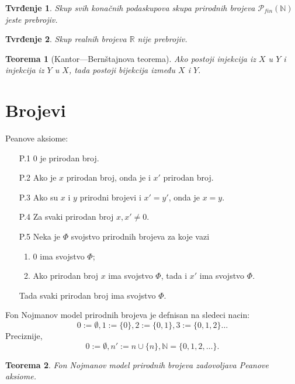 \documentclass[12p,14paper]{article}
\newtheorem*{theorem}{Teorema}
\newtheorem*{prop}{Tvrđenje}
\begin{document}
\begin{multicols}{2}
    \begin{prop}
        Skup svih konačnih podaskupova skupa prirodnih brojeva 
        $\mathcal{P}_{fin} (\mathbb{N})$ jeste prebrojiv.
    \end{prop}

    \begin{prop}
        Skup realnih brojeva $\mathbb{R}$ nije prebrojiv.
    \end{prop}

    \begin{theorem}[Kantor---Bernštajnova teorema]
        Ako postoji injekcija iz $X$ u $Y$ i injekcija iz $Y$ u $X$, 
        tada postoji bijekcija između $X$ i $Y$.
    \end{theorem}

\section{Brojevi}

    Peanove aksiome:
    \begin{enumerate}
        \itemsep0em
        \item [P.1] 0 je prirodan broj.
        \item [P.2] Ako je $x$ prirodan broj, onda je i $x'$ prirodan broj.
        \item [P.3] Ako su $x$ i $y$ prirodni brojevi i $x' = y'$, 
            onda je $x = y$.
        \item [P.4] Za svaki prirodan broj $x, x' \neq 0$.
        \item [P.5] Neka je $\Phi$ svojstvo prirodnih brojeva za koje vazi
            \begin{enumerate}
                \itemsep0em
                \item 0 ima svojstvo $\Phi$;
                \item Ako prirodan broj $x$ ima svojstvo $\Phi$, tada i $x'$ 
                    ima svojstvo $\Phi$.
            \end{enumerate}
            Tada svaki prirodan broj ima svojstvo $\Phi$.
    \end{enumerate}

    Fon Nojmanov model prirodnih brojeva je defnisan na sledeci nacin:
    \[
        0 := \emptyset, 1 := \{0\}, 2 := \{0, 1\}, 3 := \{0, 1, 2\} \ldots
    \]
    Preciznije,
    \[
        0 := \emptyset, n' := n \cup \{n\}, \mathbb{N} = \{0, 1, 2, \ldots\}.
    \]

    \begin{theorem}
        Fon Nojmanov model prirodnih brojeva zadovoljava Peanove aksiome.
    \end{theorem}


\end{multicols}
\end{document}
